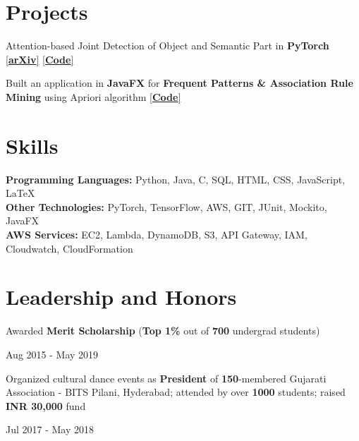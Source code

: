 \documentclass[]{Keval-resume}
\begin{document}
\section{Projects}
\hrulefill
\postsectionsep

\textbullet{} Attention-based Joint Detection of Object and Semantic Part in \textbf{PyTorch} \href{https://arxiv.org/abs/2007.02419}{[\textbf{arXiv}]} \href{https://github.com/kevalmorabia97/Object-and-Semantic-Part-Detection-pyTorch}{[\textbf{Code}]}

\textbullet{} Built an application in \textbf{JavaFX} for \textbf{Frequent Patterns \& Association Rule Mining} using Apriori algorithm \href{https://github.com/kevalmorabia97/FPARM-Frequent-Patterns-and-Association-Rule-Miner}{[\textbf{Code}]}

\sectionsep

\section{Skills} 
\hrulefill
\postsectionsep

\textbullet{} \textbf{Programming Languages:} Python, Java, C, SQL, HTML, CSS, JavaScript, LaTeX \\
\textbullet{} \textbf{Other Technologies:} PyTorch, TensorFlow, AWS, GIT, JUnit, Mockito, JavaFX \\
\textbullet{} \textbf{AWS Services:} EC2, Lambda, DynamoDB, S3, API Gateway, IAM, Cloudwatch, CloudFormation
\sectionsep

\section{Leadership and Honors} 
\hrulefill
\postsectionsep 

\begin{minipage}[t]{.78\textwidth}
	\textbullet{} Awarded \textbf{Merit Scholarship} (\textbf{Top 1\%} out of \textbf{700} undergrad students)
\end{minipage}%
\begin{minipage}[t]{.22\textwidth}
	\hfill Aug 2015 - May 2019
\end{minipage}

\begin{minipage}[t]{.78\textwidth}
	\textbullet{} Organized cultural dance events as \textbf{President} of \textbf{150}-membered Gujarati Association - BITS Pilani, Hyderabad; attended by over \textbf{1000} students; raised \textbf{INR 30,000} fund
\end{minipage}%
\begin{minipage}[t]{.22\textwidth}
	\hfill Jul 2017 - May 2018
\end{minipage}


\end{document}
